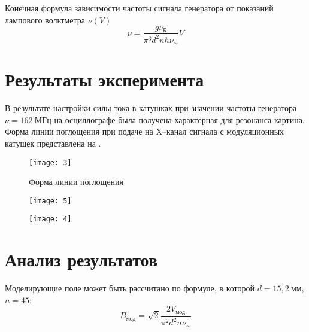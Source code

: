\documentclass[a4paper, 12pt]{article}
\begin{document}
Конечная формула зависимости частоты сигнала генератора от показаний
лампового вольтметра $\nu(V)$
\begin{equation}
    \nu = \frac{g \nu _{\text{Б}}}{\pi^3 d^2 n \hbar \nu _{\sim}}V
    \label{eq:5}
\end{equation}



\section{Результаты эксперимента}
В результате настройки силы тока в катушках при значении частоты
генератора $\nu = 162\: \text{МГц}$ на осциллографе была получена характерная для
резонанса картина. Форма линии поглощения при подаче на X–канал
сигнала с модуляционных катушек представлена на .



\begin{figure}[H]
    \texttt{[image: 3]} 
    \caption{Форма линии поглощения}
    \label{fig:3}
\end{figure}




\begin{figure}[H]
    \begin{floatrow}

        {
        \texttt{[image: 5]}
        \label{fig:4}
    }

        {
        \texttt{[image: 4]}
        \label{fig:5}
    }
    \end{floatrow}
\end{figure}









\section{Анализ результатов}
Моделирующие поле может быть рассчитано по формуле, в которой $d = 15,2\:
\text{мм}$, $n = 45$:
\begin{equation}
    B _{\text{мод}} = \sqrt{2} \frac{2 V_\text{мод}}{\pi^2 d^2 n
    \nu_\sim}
    \label{eq:6}
\end{equation}
\end{document}
